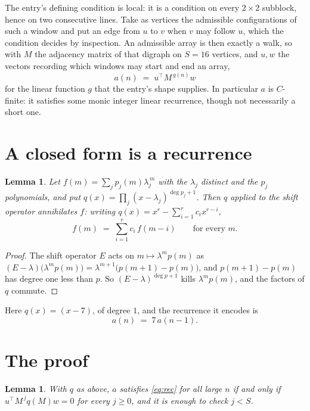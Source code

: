 \documentclass[11pt,a4paper]{article}
\theoremstyle{plain}
\newtheorem{lemma}[theorem]{Lemma}
\theoremstyle{definition}
\begin{document}
The entry's defining condition is local: it is a condition on every $2\times2$ subblock, hence on two consecutive lines. Take as vertices the
admissible configurations of such a window and put an edge from $u$ to $v$ when $v$ may
follow $u$, which the condition decides by inspection. An admissible array is then exactly a
walk, so with $M$ the adjacency matrix of that digraph on $S=16$ vertices, and $u,w$ the
vectors recording which windows may start and end an array,
\[
a(n)\;=\;u^{\!\top}M^{\,g(n)}w
\]
for the linear function $g$ that the entry's shape supplies. In particular $a$ is
$C$-finite: it satisfies some monic integer linear recurrence, though not necessarily a short
one.

\section{A closed form is a recurrence}

\begin{lemma}\label{lem:ann}
Let $f(m)=\sum_{j}p_j(m)\lambda_j^{\,m}$ with the $\lambda_j$ distinct and the $p_j$
polynomials, and put $q(x)=\prod_j(x-\lambda_j)^{\deg p_j+1}$. Then $q$ applied to the shift
operator annihilates $f$: writing $q(x)=x^{r}-\sum_{i=1}^{r}c_ix^{r-i}$,
\[
f(m)\;=\;\sum_{i=1}^{r}c_i\,f(m-i)\qquad\text{for every }m.
\]
\end{lemma}

\begin{proof}
The shift operator $E$ acts on $m\mapsto\lambda^{m}p(m)$ as
$(E-\lambda)\bigl(\lambda^{m}p(m)\bigr)=\lambda^{m+1}\bigl(p(m+1)-p(m)\bigr)$, and
$p(m+1)-p(m)$ has degree one less than $p$. So $(E-\lambda)^{\deg p+1}$ kills
$\lambda^{m}p(m)$, and the factors of $q$ commute.
\end{proof}

Here $q(x)=(x-7)$, of degree $1$, and the recurrence it encodes is
\begin{equation}\label{eq:rec}
a(n)\;=\;7\,a(n-1).
\end{equation}

\section{The proof}

\begin{lemma}\label{lem:crit}
With $q$ as above, $a$ satisfies \eqref{eq:rec} for all large $n$ if and only if
$u^{\!\top}M^{\,j}q(M)w=0$ for every $j\ge0$, and it is enough to check $j<S$.
\end{lemma}
\end{document}
